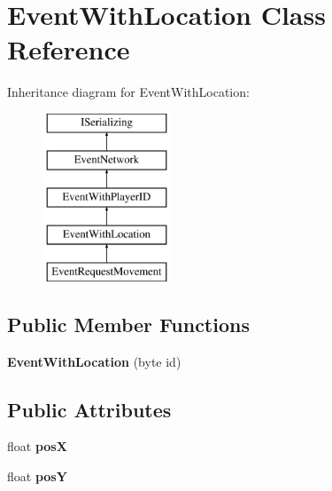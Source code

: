 \hypertarget{class_event_with_location}{\section{Event\-With\-Location Class Reference}
\label{class_event_with_location}
}
Inheritance diagram for Event\-With\-Location\-:\begin{figure}[H]
\begin{center}
\leavevmode
\includegraphics[height=5.000000cm]{class_event_with_location}
\end{center}
\end{figure}
\subsection*{Public Member Functions}
\begin{DoxyCompactItemize}
\item 
\hypertarget{class_event_with_location_a1771f2cfe61d2fe0e5c2e9c3918f1af0}{{\bfseries Event\-With\-Location} (byte id)}\label{class_event_with_location_a1771f2cfe61d2fe0e5c2e9c3918f1af0}

\end{DoxyCompactItemize}
\subsection*{Public Attributes}
\begin{DoxyCompactItemize}
\item 
\hypertarget{class_event_with_location_a60216348b1c3955d7d1365aaffa80f4f}{float {\bfseries pos\-X}}\label{class_event_with_location_a60216348b1c3955d7d1365aaffa80f4f}

\item 
\hypertarget{class_event_with_location_abcb12fbeee8ae457db23ab2e0aacd870}{float {\bfseries pos\-Y}}\label{class_event_with_location_abcb12fbeee8ae457db23ab2e0aacd870}

\end{DoxyCompactItemize}
